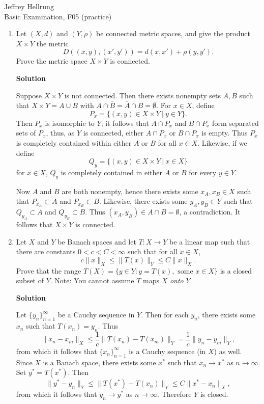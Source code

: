 \documentclass{article}
\begin{document}
\begin{flushright}
Jeffrey Hellrung \\
Basic Examination, F05 (practice) \\
\end{flushright}


\begin{enumerate}

\item Let \((X,d)\) and \((Y,\rho)\) be connected metric spaces, and give the product \(X \times Y\) the metric
\[D((x,y), (x',y')) = d(x,x') + \rho(y,y').\]
Prove the metric space \(X \times Y\) is connected.

{\bf Solution}

Suppose \(X \times Y\) is not connected.  Then there exists nonempty sets \(A,B\) such that \(X \times Y = A \cup B\) with \(A \cap \overline{B} = \overline{A} \cap B = \emptyset\).  For \(x \in X\), define
\[P_x = \{(x,y) \in X \times Y \ | \ y \in Y\}.\]
Then \(P_x\) is isomorphic to \(Y\); it follows that \(A \cap P_x\) and \(B \cap P_x\) form separated sets of \(P_x\), thus, as \(Y\) is connected, either \(A \cap P_x\) or \(B \cap P_x\) is empty.  Thus \(P_x\) is completely contained within either \(A\) or \(B\) for all \(x \in X\).  Likewise, if we define
\[Q_y = \{(x,y) \in X \times Y \ | \ x \in X\}\]
for \(x \in X\), \(Q_y\) is completely contained in either \(A\) or \(B\) for every \(y \in Y\).

Now \(A\) and \(B\) are both nonempty, hence there exists some \(x_A,x_B \in X\) such that \(P_{x_A} \subset A\) and \(P_{x_B} \subset B\).  Likewise, there exists some \(y_A, y_B \in Y\) such that \(Q_{y_A} \subset A\) and \(Q_{y_B} \subset B\).  Thus \((x_A, y_B) \in A \cap B = \emptyset\), a contradiction.  It follows that \(X \times Y\) is connected.



\item Let \(X\) and \(Y\) be Banach spaces and let \(T : X \to Y\) be a linear map such that there are constants \(0 < c < C < \infty\) such that for all \(x \in X\),
\[c \|x\|_X \leq \|T(x)\|_Y \leq C \|x\|_X.\]
Prove that the range \(T(X) = \{y \in Y : y = T(x), \text{ some } x \in X\}\) is a closed subset of \(Y\).  Note:  You cannot assume \(T\) maps \(X\) {\em onto} \(Y\).

{\bf Solution}

Let \(\{y_n\}_{n = 1}^{\infty}\) be a Cauchy sequence in \(Y\).  Then for each \(y_n\), there exists some \(x_n\) such that \(T(x_n) = y_n\).  Thus
\[\|x_n - x_m\|_X
  \leq \frac{1}{c} \|T(x_n) - T(x_m)\|_Y
     = \frac{1}{c} \|y_n - y_m\|_Y,\]
from which it follows that \(\{x_n\}_{n = 1}^{\infty}\) is a Cauchy sequence (in \(X\)) as well.  Since \(X\) is a Banach space, there exists some \(x^*\) such that \(x_n \to x^*\) as \(n \to \infty\).  Set \(y^* = T(x^*)\).  Then
\[\|y^* - y_n\|_Y
  \leq \|T(x^*) - T(x_n)\|_Y
  \leq C \|x^* - x_n\|_X,\]
from which it follows that \(y_n \to y^*\) as \(n \to \infty\).  Therefore \(Y\) is closed.




\end{enumerate}
\end{document}
